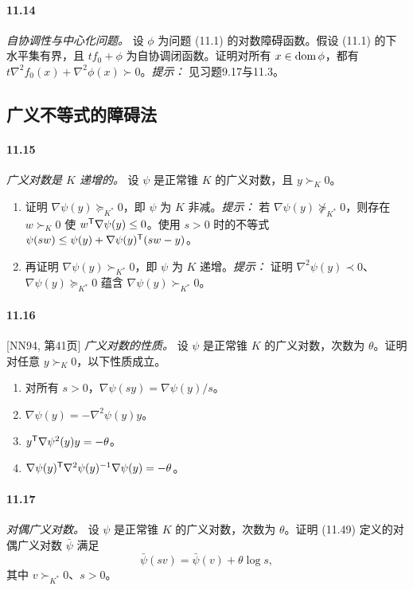 \paragraph{11.14} \emph{自协调性与中心化问题。} 设 $\phi$ 为问题 (11.1) 的对数障碍函数。假设 (11.1) 的下水平集有界，且 $tf_0+\phi$ 为自协调闭函数。证明对所有 $x\in\operatorname{dom}\phi$，都有 $t\nabla^2 f_0(x)+\nabla^2\phi(x)\succ0$。\emph{提示：} 见习题9.17与11.3。

\subsection*{广义不等式的障碍法}
\paragraph{11.15} \emph{广义对数是 $K$ 递增的。} 设 $\psi$ 是正常锥 $K$ 的广义对数，且 $y\succ_K0$。
\begin{enumerate}
\item[(a)] 证明 $\nabla\psi(y)\succeq_{K^*}0$，即 $\psi$ 为 $K$ 非减。\emph{提示：} 若 $\nabla\psi(y)\not\succeq_{K^*}0$，则存在 $w\succ_K0$ 使 $w^\mathsf T\nabla\psi(y)\le0$。使用 $s>0$ 时的不等式 $\psi(sw)\le\psi(y)+\nabla\psi(y)^\mathsf T(sw-y)$。
\item[(b)] 再证明 $\nabla\psi(y)\succ_{K^*}0$，即 $\psi$ 为 $K$ 递增。\emph{提示：} 证明 $\nabla^2\psi(y)\prec0$、$\nabla\psi(y)\succeq_{K^*}0$ 蕴含 $\nabla\psi(y)\succ_{K^*}0$。
\end{enumerate}

\paragraph{11.16} [NN94, 第41页] \emph{广义对数的性质。} 设 $\psi$ 是正常锥 $K$ 的广义对数，次数为 $\theta$。证明对任意 $y\succ_K0$，以下性质成立。
\begin{enumerate}
\item[(a)] 对所有 $s>0$，$\nabla\psi(sy)=\nabla\psi(y)/s$。
\item[(b)] $\nabla\psi(y)=-\nabla^2\psi(y)y$。
\item[(c)] $y^\mathsf T\nabla\psi^2(y)y=-\theta$。
\item[(d)] $\nabla\psi(y)^\mathsf T\nabla^2\psi(y)^{-1}\nabla\psi(y)=-\theta$。
\end{enumerate}

\paragraph{11.17} \emph{对偶广义对数。} 设 $\psi$ 是正常锥 $K$ 的广义对数，次数为 $\theta$。证明 (11.49) 定义的对偶广义对数 $\bar\psi$ 满足
\[
\bar\psi(sv)=\bar\psi(v)+\theta\log s,
\]
其中 $v\succ_{K^*}0$、$s>0$。

